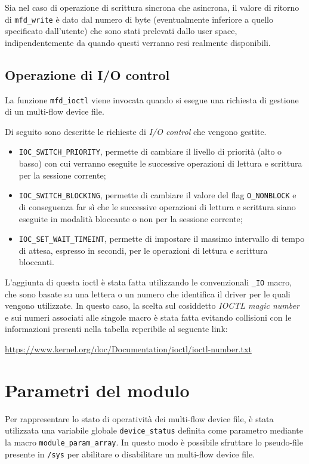 \documentclass{article}
\begin{document}
Sia nel caso di operazione di scrittura sincrona che asincrona, il valore di ritorno di \texttt{mfd\_write} è dato dal numero di byte (eventualmente inferiore a quello specificato dall'utente) che sono stati prelevati dallo user space, indipendentemente da quando questi verranno resi realmente disponibili.

\subsection{Operazione di I/O control}
La funzione \texttt{mfd\_ioctl} viene invocata quando si esegue una richiesta di gestione di un multi-flow device file.

Di seguito sono descritte le richieste di \textsl{I/O control} che vengono gestite.
\begin{itemize}
\item \texttt{IOC\_SWITCH\_PRIORITY}, permette di cambiare il livello di priorità (alto o basso) con cui verranno eseguite le successive operazioni di lettura e scrittura per la sessione corrente;
\item \texttt{IOC\_SWITCH\_BLOCKING}, permette di cambiare il valore del flag \texttt{O\_NONBLOCK} e di conseguenza far sì che le successive operazioni di lettura e scrittura siano eseguite in modalità bloccante o non per la sessione corrente;
\item \texttt{IOC\_SET\_WAIT\_TIMEINT}, permette di impostare il massimo intervallo di tempo di attesa, espresso in secondi, per le operazioni di lettura e scrittura bloccanti.
\end{itemize}

L'aggiunta di questa ioctl è stata fatta utilizzando le convenzionali \texttt{\_IO} macro, che sono basate su una lettera o un numero che identifica il driver per le quali vengono utilizzate. In questo caso, la scelta sul cosiddetto \textsl{IOCTL magic number} e sui numeri associati alle singole macro è stata fatta evitando collisioni con le informazioni presenti nella tabella reperibile al seguente link:
\begin{center}
\url{https://www.kernel.org/doc/Documentation/ioctl/ioctl-number.txt}
\end{center}

\section{Parametri del modulo}
Per rappresentare lo stato di operatività dei multi-flow device file, è stata utilizzata una variabile globale \texttt{device\_status} definita come parametro mediante la macro \texttt{module\_param\_array}. In questo modo è possibile sfruttare lo pseudo-file presente in \texttt{/sys} per abilitare o disabilitare un multi-flow device file.
\end{document}
